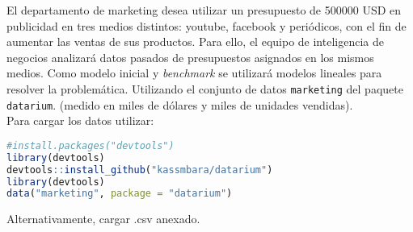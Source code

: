 
\addpoints
\question El departamento de marketing desea utilizar un presupuesto de 500000 USD en publicidad en tres medios distintos: youtube, facebook y periódicos, con el fin de aumentar las ventas de sus productos. Para ello, el equipo de inteligencia de negocios analizará datos pasados de presupuestos asignados en los mismos medios. Como modelo inicial y \textit{benchmark} se utilizará modelos lineales para resolver la problemática. Utilizando el conjunto de datos \texttt{marketing} del paquete \texttt{datarium}. (medido en miles de dólares y miles de unidades vendidas).\\

Para cargar los datos utilizar:

\begin{lstlisting}[language=R]
#install.packages("devtools")
library(devtools)
devtools::install_github("kassmbara/datarium")
library(devtools)
data("marketing", package = "datarium")
\end{lstlisting}

Alternativamente, cargar .csv anexado.

